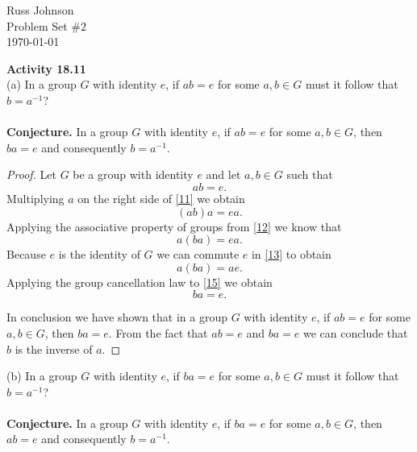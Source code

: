 \documentclass[11pt,a4paper]{article}
\begin{document}
\begin{flushright}
Russ Johnson\\
Problem Set $\#2$\\
\today\\
\end{flushright}

{\bf Activity 18.11}\\
(a) In a group $G$ with identity $e$, if $ab = e$ for some $a, b \in G$ must it follow
that $b = a^{-1}$?\\
~\\
{\bf Conjecture.} In a group $G$ with identity $e$, if $ab = e$ for some $a, b \in G$, then $ba = e$ and consequently $b = a^{-1}$.

\begin{proof}
Let $G$ be a group with identity $e$ and let $a,b \in G$ such that
\begin{equation}\label{11}
ab = e.
\end{equation}
Multiplying $a$ on the right side of \eqref{11} we obtain
\begin{equation}\label{12}
(ab)a = ea.
\end{equation}
Applying the associative property of groups from \eqref{12} we know that
\begin{equation}\label{13}
a(ba) = ea.
\end{equation}
Because $e$ is the identity of $G$ we can commute $e$ in \eqref{13} to obtain
\begin{equation}\label{15}
a(ba) = ae.
\end{equation}
Applying the group cancellation law to \eqref{15} we obtain
\begin{equation}
ba = e.
\end{equation}

In conclusion we have shown that in a group $G$ with identity $e$, if $ab = e$ for some $a, b \in G$, then $ba = e$. From the fact that $ab = e$ and $ba = e$ we can conclude that $b$ is the inverse of $a$.
\end{proof}

(b) In a group $G$ with identity $e$, if $ba = e$ for some $a, b \in G$ must it follow
that $b = a^{-1}$?\\
~\\
{\bf Conjecture.} In a group $G$ with identity $e$, if $ba = e$ for some $a, b \in G$, then $ab = e$ and consequently $b = a^{-1}$.
\end{document}

